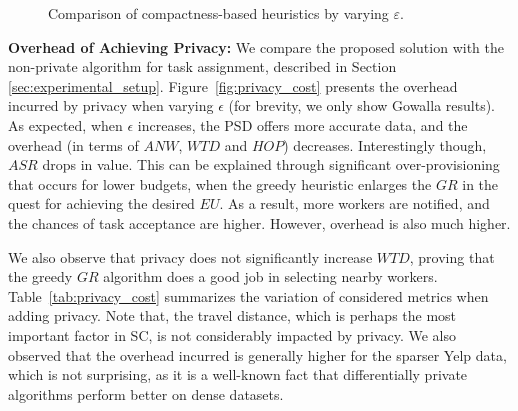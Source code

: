 \documentclass{USC-Thesis}
\numberwithin{equation}{chapter}
\begin{document}
\begin{figure*}[!ht]
\begin{comment}
	\begin{minipage}[b]{0.195\linewidth}
	\centering
		\texttt{[image: exps/ye\_zi\_2\_cmp]}
		\subcaption{$\mathit{CMP}$, Ye.-Zipf}
		\label{fig:ye_zi_2_cmp}
	\end{minipage}
	\begin{minipage}[b]{0.195\linewidth}
	\centering
		\texttt{[image: exps/ye\_zi\_2\_hop]}
		\subcaption{$\mathit{HOP}$, Ye.-Zipf}
		\label{fig:ye_zi_2_hop}
	\end{minipage}
	\begin{minipage}[b]{0.195\linewidth}
	\centering
		\texttt{[image: exps/ye\_zi\_2\_anw]}
		\subcaption{$\mathit{ANW}$, Ye.-Zipf}
		\label{fig:ye_zi_2_anw}
	\end{minipage}
	\begin{minipage}[b]{0.195\linewidth}
		\centering
		\texttt{[image: exps/ye\_zi\_2\_atd1]}
		\subcaption{$\mathit{WTD1}$, Ye.-Zipf}
		\label{fig:ye_zi_2_atd1}
	\end{minipage}
	\begin{minipage}[b]{0.195\linewidth}
	\centering
		\texttt{[image: exps/ye\_zi\_2\_atd2]}
		\subcaption{$\mathit{WTD2}$, Ye.-Zipf}
		\label{fig:ye_zi_2_atd2}
	\end{minipage}
\end{comment}	
	\caption{Comparison of compactness-based heuristics by varying $\varepsilon$.}
\label{fig:compactness_heuristic}
\end{figure*}

\textbf{Overhead of Achieving Privacy:}
We compare the proposed solution with the non-private algorithm for task assignment, described in Section \ref{sec:experimental_setup}. Figure~\ref{fig:privacy_cost} presents the overhead incurred by privacy when varying $\epsilon$ (for brevity, we only show Gowalla results). As expected, when $\epsilon$ increases, the PSD offers more accurate data, and the overhead (in terms of $\mathit{ANW}$, $\mathit{WTD}$ and $\mathit{HOP}$) decreases.
Interestingly though, $\mathit{ASR}$ drops in value. This can be explained through significant over-provisioning that occurs for lower budgets, when the greedy heuristic enlarges the $\mathit{GR}$ in the quest for achieving the desired $\mathit{EU}$. As a result, more workers are notified, and the chances of task acceptance are higher. However, overhead is also much higher.

We also observe that privacy does not significantly increase $\mathit{WTD}$, proving that the greedy $\mathit{GR}$ algorithm does a good job in selecting nearby workers. 
Table~\ref{tab:privacy_cost} summarizes the variation of considered metrics when adding privacy. Note that, the travel distance, which is perhaps the most important factor in SC, is not considerably impacted by privacy. We also observed that the overhead incurred is generally higher for the sparser Yelp data, which is not surprising, 
as it is a well-known fact that differentially private algorithms perform better on dense datasets.
\end{document}
